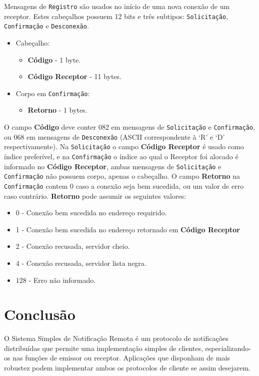 \documentclass[12pt]{article}
\begin{document}
Mensagens de {\tt Registro} são usados no início de uma nova conexão de um receptor.
Estes cabeçalhos possuem 12 bits e três subtipos:
{\tt Solicitação}, {\tt Confirmação} e {\tt Desconexão}.
\begin{itemize}
\item Cabeçalho:
	\begin{itemize}
	\item {\bf Código} - 1 byte.
	\item {\bf Código Receptor} - 11 bytes.
	\end{itemize}
\item Corpo em {\tt Confirmação}:
	\begin{itemize}
	\item {\bf Retorno} - 1 bytes.
	\end{itemize}
\end{itemize}
O campo {\bf Código} deve conter 082 em mensagens de {\tt Solicitação} e {\tt Confirmação},
ou 068 em mensagens de {\tt Desconexão} (ASCII correspondente à `R' e `D' respectivamente).
Na {\tt Solicitação} o campo {\bf Código Receptor} é usado como índice preferível,
e na {\tt Confirmação} o índice ao qual o Receptor foi alocado é informado no {\bf Código Receptor},
ambas mensagens de {\tt Solicitação} e {\tt Confirmação} não possuem corpo, apenas o cabeçalho.
O campo {\bf Retorno} na {\tt Confirmação} contem 0 caso a conexão seja bem sucedida, ou um valor de erro caso contrário.
{\bf Retorno} pode assumir os seguintes valores:
\begin{itemize}
\item 0 - Conexão bem sucedida no endereço requirido.
\item 1 - Conexão bem sucedida no endereço retornado em {\bf Código Receptor}
\item 2 - Conexão recusada, servidor cheio.
\item 4 - Conexão recusada, servidor lista negra.
\item 128 - Erro não informado.
\end{itemize}

\section{Conclusão}\label{sec:Conclusao}

O Sistema Simples de Notificação Remota é um protocolo de notificações distribuídas que
permite uma implementação simples de clientes,
especializando-os nas funções de emissor ou receptor.
Aplicações que disponham de mais robustez podem implementar ambos os protocolos de cliente se assim desejarem.
\end{document}
